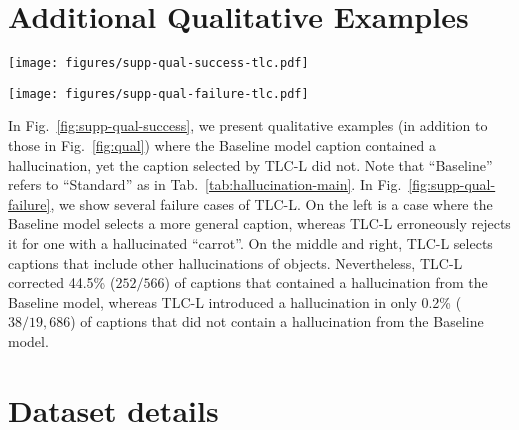 \documentclass[10pt,twocolumn,letterpaper]{article}
\newcommand{\figref}[1]{Fig.\xspace~\ref{#1}}
\newcommand{\tabref}[1]{Tab.\xspace~\ref{#1}}
\newcommand{\ApproachName}{TLC\xspace}
\newcommand{\OFALarge}{OFA$_{\text{Large}}$\xspace}
\begin{document}
\section{Additional Qualitative Examples}
\label{sec:supp-qual}

\begin{figure*}
  \centering
     \texttt{[image: figures/supp-qual-success-tlc.pdf]}
  \caption{Additional qualitative examples on our test set for \ApproachName-L on \OFALarge, where the Baseline model caption contained a hallucination, yet the caption selected by \ApproachName-L did not.
  }
  \label{fig:supp-qual-success}
\end{figure*} \begin{figure*}
  \centering
     \texttt{[image: figures/supp-qual-failure-tlc.pdf]}
  \caption{Failure cases on our test set for \ApproachName-L on \OFALarge, where \ApproachName-L selected a caption with a hallucination, yet the Baseline did not.
  }
  \label{fig:supp-qual-failure}
\end{figure*} 
In \figref{fig:supp-qual-success}, we present qualitative examples (in addition to those in \figref{fig:qual}) where the Baseline model caption contained a hallucination, yet the caption selected by \ApproachName-L did not. Note that ``Baseline'' refers to ``Standard'' as in \tabref{tab:hallucination-main}. In \figref{fig:supp-qual-failure}, we show several failure cases of \ApproachName-L. On the left is a case where the Baseline model selects a more general caption, whereas \ApproachName-L erroneously rejects it for one with a hallucinated ``carrot''. On the middle and right, \ApproachName-L selects captions that include other hallucinations of objects. Nevertheless, \ApproachName-L corrected 44.5\% ($252/566$) of captions that contained a hallucination from the Baseline model, whereas \ApproachName-L introduced a hallucination in only 0.2\% ($38/19,686$) of captions that did not contain a hallucination from the Baseline model.


\section{Dataset details}
\label{sec:supp-dataset}
\end{document}
